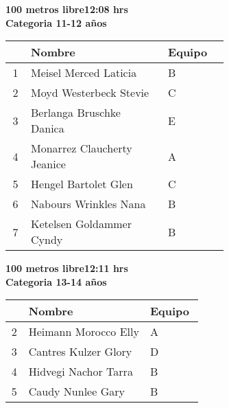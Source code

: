 \begin{minipage}{0.95\linewidth}\vspace{0.5cm} 
\begin{flushleft}
\textbf{
\hspace{-0.15cm}100 metros libre\hspace{1.5cm}12:08 hrs \\Categoria 11-12 años}\vspace{-0.2cm} 
\end{flushleft}
\begin{tabular}{cp{0.63\linewidth}l}
\hline
& \textbf{Nombre} & \textbf{Equipo} \\ \hline
1 & Meisel Merced Laticia & B \\ 
2 & Moyd Westerbeck Stevie & C \\ 
3 & Berlanga Bruschke Danica & E \\ 
4 & Monarrez Claucherty Jeanice & A \\ 
5 & Hengel Bartolet Glen & C \\ 
6 & Nabours Wrinkles Nana & B \\ 
7 & Ketelsen Goldammer Cyndy & B \\ 
\end{tabular}
\end{minipage}
\begin{minipage}{0.95\linewidth}\vspace{0.5cm} 
\begin{flushleft}
\textbf{
\hspace{-0.15cm}100 metros libre\hspace{1.5cm}12:11 hrs \\Categoria 13-14 años}\vspace{-0.2cm} 
\end{flushleft}
\begin{tabular}{cp{0.63\linewidth}l}
\hline
& \textbf{Nombre} & \textbf{Equipo} \\ \hline
2 & Heimann Morocco Elly & A \\ 
3 & Cantres Kulzer Glory & D \\ 
4 & Hidvegi Nachor Tarra & B \\ 
5 & Caudy Nunlee Gary & B \\ 
\end{tabular}
\end{minipage}
